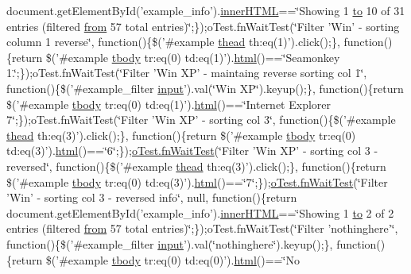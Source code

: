 \begin{DoxyCompactItemize}
document.\+get\+Element\+By\+Id('example\+\_\+info').\hyperlink{jquery-ui_8js_a87f73c4f0391c1cf9fe60374a76d9a7b}{inner\+H\+T\+M\+L}==\char`\"{}Showing 1 \hyperlink{jquery-ui_8js_af6086621f45baa2cf538f19e45d3c263}{to} 10 of 31 entries (filtered \hyperlink{jquery-ui_8js_ace03b192fd101a1c5648340bc09b7229}{from} 57 total entries)\char`\"{};\});o\+Test.\+fn\+Wait\+Test(\char`\"{}Filter 'Win' -\/ sorting column 1 reverse\char`\"{}, function()\{\$('\#example \hyperlink{core_8constructor_8js_a856be760b6816c9591ce69f0a2b43693}{thead} th\+:eq(1)').click();\}, function()\{return \$('\#example \hyperlink{core_8constructor_8js_a99b0542c7c50fe8757c55bf9dac5f3be}{tbody} tr\+:eq(0) td\+:eq(1)').\hyperlink{tinymce_8jquery_8dev_8js_ac2090bcf2ff968c0083d5de53a6544f3}{html}()==\char`\"{}Seamonkey 1.\char`\"{};\});o\+Test.\+fn\+Wait\+Test(\char`\"{}Filter 'Win X\+P' -\/ maintaing reverse sorting col 1\char`\"{}, function()\{\$('\#example\+\_\+filter \hyperlink{validate_8js_a07a2aabd64594dc36dd810cad2669deb}{input}').val(\char`\"{}Win X\+P\char`\"{}).keyup();\}, function()\{return \$('\#example \hyperlink{core_8constructor_8js_a99b0542c7c50fe8757c55bf9dac5f3be}{tbody} tr\+:eq(0) td\+:eq(1)').\hyperlink{tinymce_8jquery_8dev_8js_ac2090bcf2ff968c0083d5de53a6544f3}{html}()==\char`\"{}Internet Explorer 7\char`\"{};\});o\+Test.\+fn\+Wait\+Test(\char`\"{}Filter 'Win X\+P' -\/ sorting col 3\char`\"{}, function()\{\$('\#example \hyperlink{core_8constructor_8js_a856be760b6816c9591ce69f0a2b43693}{thead} th\+:eq(3)').click();\}, function()\{return \$('\#example \hyperlink{core_8constructor_8js_a99b0542c7c50fe8757c55bf9dac5f3be}{tbody} tr\+:eq(0) td\+:eq(3)').\hyperlink{tinymce_8jquery_8dev_8js_ac2090bcf2ff968c0083d5de53a6544f3}{html}()==\char`\"{}6\char`\"{};\});\hyperlink{onhold_24__server-side_2__zero__config_8js_ab25c4d596771c0133cdc45178ce72c3d}{o\+Test.\+fn\+Wait\+Test}(\char`\"{}Filter 'Win X\+P' -\/ sorting col 3 -\/ reversed\char`\"{}, function()\{\$('\#example \hyperlink{core_8constructor_8js_a856be760b6816c9591ce69f0a2b43693}{thead} th\+:eq(3)').click();\}, function()\{return \$('\#example \hyperlink{core_8constructor_8js_a99b0542c7c50fe8757c55bf9dac5f3be}{tbody} tr\+:eq(0) td\+:eq(3)').\hyperlink{tinymce_8jquery_8dev_8js_ac2090bcf2ff968c0083d5de53a6544f3}{html}()==\char`\"{}7\char`\"{};\});\hyperlink{onhold_24__server-side_2__zero__config_8js_ab25c4d596771c0133cdc45178ce72c3d}{o\+Test.\+fn\+Wait\+Test}(\char`\"{}Filter 'Win' -\/ sorting col 3 -\/ reversed info\char`\"{}, null, function()\{return document.\+get\+Element\+By\+Id('example\+\_\+info').\hyperlink{jquery-ui_8js_a87f73c4f0391c1cf9fe60374a76d9a7b}{inner\+H\+T\+M\+L}==\char`\"{}Showing 1 \hyperlink{jquery-ui_8js_af6086621f45baa2cf538f19e45d3c263}{to} 2 of 2 entries (filtered \hyperlink{jquery-ui_8js_ace03b192fd101a1c5648340bc09b7229}{from} 57 total entries)\char`\"{};\});o\+Test.\+fn\+Wait\+Test(\char`\"{}Filter 'nothinghere'\char`\"{}, function()\{\$('\#example\+\_\+filter \hyperlink{validate_8js_a07a2aabd64594dc36dd810cad2669deb}{input}').val(\char`\"{}nothinghere\char`\"{}).keyup();\}, function()\{return \$('\#example \hyperlink{core_8constructor_8js_a99b0542c7c50fe8757c55bf9dac5f3be}{tbody} tr\+:eq(0) td\+:eq(0)').\hyperlink{tinymce_8jquery_8dev_8js_ac2090bcf2ff968c0083d5de53a6544f3}{html}()==\char`\"{}No 
\end{DoxyCompactItemize}
